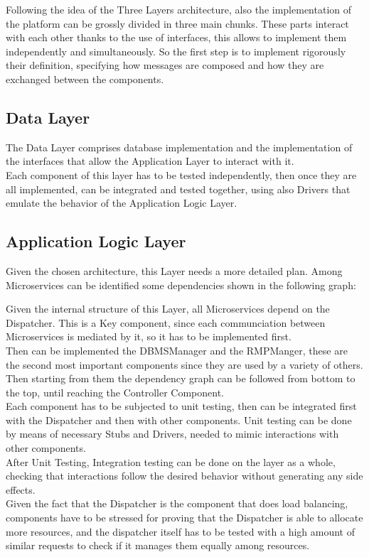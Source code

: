 Following the idea of the Three Layers architecture, also the implementation of the platform can be grossly divided in three main chunks.
These parts interact with each other thanks to the use of interfaces, this allows to implement them independently and simultaneously. So the first step is to implement rigorously their definition, specifying how messages are composed and how they are exchanged between the components.\\

\subsection{Data Layer}
The Data Layer comprises database implementation and the implementation of the interfaces that allow the Application Layer to interact with it.\\
Each component of this layer has to be tested independently, then once they are all implemented, can be integrated and tested together, using also Drivers that emulate the behavior of the Application Logic Layer.\\
\subsection{Application Logic Layer}
Given the chosen architecture, this Layer needs a more detailed plan. Among Microservices can be identified some dependencies shown in the following graph:


Given the internal structure of this Layer, all Microservices depend on the Dispatcher. This is a Key component, since each communciation between Microservices is mediated by it, so it has to be implemented first.\\
Then can be implemented the DBMSManager and the RMPManger, these are the second most important components since they are used by a variety of others. Then starting from them the dependency graph can be followed from bottom to the top, until reaching the Controller Component.\\
Each component has to be subjected to unit testing, then can be integrated first with the Dispatcher and then with other components. Unit testing can be done by means of necessary Stubs and Drivers, needed to mimic interactions with other components.\\
After Unit Testing, Integration testing can be done on the layer as a whole, checking that interactions follow the desired behavior without generating any side effects.\\
Given the fact that the Dispatcher is the component that does load balancing, components have to be stressed for proving that the Dispatcher is able to allocate more resources, and the dispatcher itself has to be tested with a high amount of similar requests to check if it manages them equally among resources.\\

